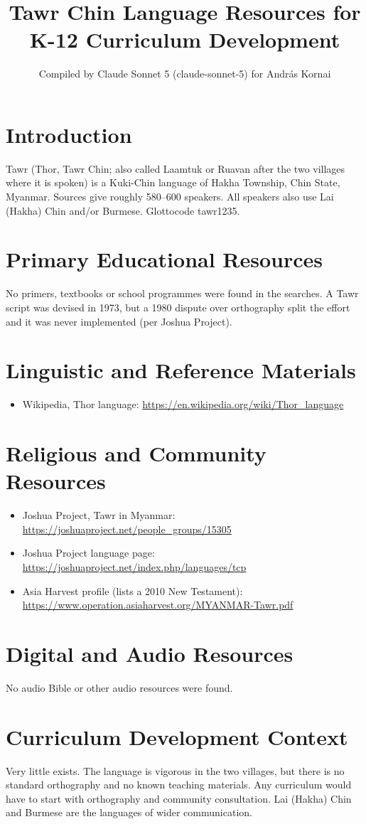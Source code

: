 \documentclass[12pt]{article}
\title{Tawr Chin Language Resources for K-12 Curriculum Development}
\author{Compiled by Claude Sonnet 5 (claude-sonnet-5) for Andr\'as Kornai}
\date{}
\begin{document}
\maketitle
\section{Introduction}
Tawr (Thor, Tawr Chin; also called Laamtuk or Ruavan after the two villages where it is spoken) is a Kuki-Chin language of Hakha Township, Chin State, Myanmar. Sources give roughly 580--600 speakers. All speakers also use Lai (Hakha) Chin and/or Burmese. Glottocode tawr1235.
\section{Primary Educational Resources}
No primers, textbooks or school programmes were found in the searches. A Tawr script was devised in 1973, but a 1980 dispute over orthography split the effort and it was never implemented (per Joshua Project).
\section{Linguistic and Reference Materials}
\begin{itemize}
\item Wikipedia, Thor language: \url{https://en.wikipedia.org/wiki/Thor_language}
\end{itemize}
\section{Religious and Community Resources}
\begin{itemize}
\item Joshua Project, Tawr in Myanmar: \url{https://joshuaproject.net/people_groups/15305}
\item Joshua Project language page: \url{https://joshuaproject.net/index.php/languages/tcp}
\item Asia Harvest profile (lists a 2010 New Testament): \url{https://www.operation.asiaharvest.org/MYANMAR-Tawr.pdf}
\end{itemize}
\section{Digital and Audio Resources}
No audio Bible or other audio resources were found.
\section{Curriculum Development Context}
Very little exists. The language is vigorous in the two villages, but there is no standard orthography and no known teaching materials. Any curriculum would have to start with orthography and community consultation. Lai (Hakha) Chin and Burmese are the languages of wider communication.
\end{document}
